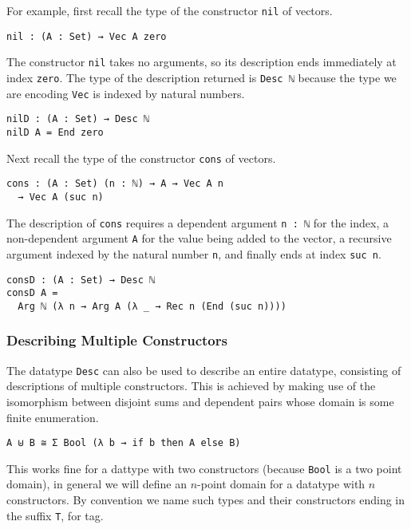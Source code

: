 \documentclass[preprint,nonatbib]{sigplanconf}
\begin{document}
For example, first recall the type of the
constructor {\tt nil} of vectors.

\begin{verbatim}
nil : (A : Set) → Vec A zero
\end{verbatim}

The constructor {\tt nil} takes no arguments, so its description
ends immediately at index {\tt zero}. The type of the description
returned is {\tt Desc ℕ} because the type we are encoding {\tt Vec}
is indexed by natural numbers.

\begin{verbatim}
nilD : (A : Set) → Desc ℕ
nilD A = End zero
\end{verbatim}

Next recall the type of the
constructor {\tt cons} of vectors.

\begin{verbatim}
cons : (A : Set) (n : ℕ) → A → Vec A n
  → Vec A (suc n)
\end{verbatim}

The description of {\tt cons} requires a dependent argument
{\tt n : ℕ} for the index, a non-dependent argument {\tt A} for the value
being added to the vector, a recursive argument indexed by the
natural number {\tt n}, and finally ends at index {\tt suc n}.

\begin{verbatim}
consD : (A : Set) → Desc ℕ
consD A =
  Arg ℕ (λ n → Arg A (λ _ → Rec n (End (suc n))))
\end{verbatim}

\subsubsection{Describing Multiple Constructors}
\label{sec:background:multiple}

The datatype {\tt Desc} can also be used to describe an entire
datatype, consisting of descriptions of multiple constructors.
This is achieved by making use of the isomorphism between disjoint
sums and dependent pairs whose domain is some finite enumeration.

\begin{verbatim}
A ⊎ B ≅ Σ Bool (λ b → if b then A else B)
\end{verbatim}

This works fine for a dattype with two constructors (because {\tt Bool} is a two point domain),
in general we will define an $n$-point domain for a datatype with $n$ constructors. By
convention we name such types and their constructors ending in the suffix {\tt T}, for tag.
\end{document}
